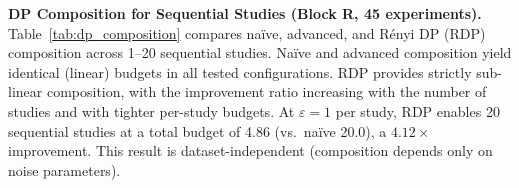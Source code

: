 \documentclass[conference]{IEEEtran}
\begin{document}
\begin{table}[htbp]
\centering
\caption{Concept drift robustness on Cardiovascular (Block~Q, 36 experiments, 2 seeds). Drop: accuracy decrease from pre-drift. Recovery: accuracy gain from adaptation.}
\label{tab:concept_drift}
\end{table}

\smallskip\noindent\textbf{DP Composition for Sequential Studies (Block R, 45 experiments).}
Table~\ref{tab:dp_composition} compares na\"ive, advanced, and R\'enyi DP (RDP) composition across 1--20 sequential studies. Na\"ive and advanced composition yield identical (linear) budgets in all tested configurations. RDP provides strictly sub-linear composition, with the improvement ratio increasing with the number of studies and with tighter per-study budgets. At $\varepsilon{=}1$ per study, RDP enables 20 sequential studies at a total budget of 4.86 (vs.\ na\"ive 20.0), a $4.12\times$ improvement. This result is dataset-independent (composition depends only on noise parameters).
\end{document}
